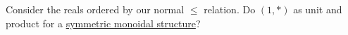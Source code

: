 Consider the reals ordered by our normal $\leq$ relation. Do $(1,*)$ as unit and product for a \href{doc/1 math/Seven Sketches in Compositionality/Chapter 2: Resource theories/2 Symmetric monoidal preorders/1 Definition and first examples/1 Symmetric monoidal structure on a preorder}{symmetric monoidal structure}?